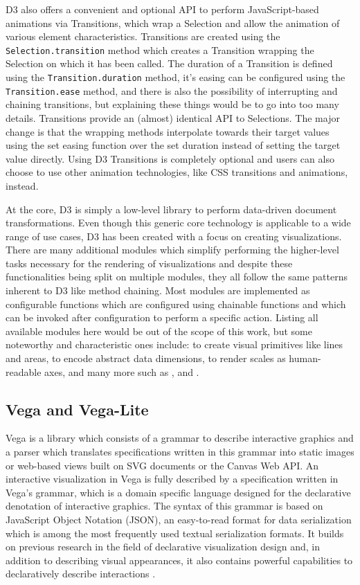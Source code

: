 D3 also offers a convenient and optional API to perform JavaScript-based animations via Transitions, which wrap a Selection and allow the animation of various element characteristics. 
Transitions are created using the \lstinline{Selection.transition} method which creates a Transition wrapping the Selection on which it has been called. 
The duration of a Transition is defined using the \lstinline{Transition.duration} method, it's easing can be configured using the \lstinline{Transition.ease} method, and there is also the possibility of interrupting and chaining transitions, but explaining these things would be to go into too many details. Transitions provide an (almost) identical API to Selections. The major change is that the wrapping methods interpolate towards their target values using the set easing function over the set duration instead of setting the target value directly. Using D3 Transitions is completely optional and users can also choose to use other animation technologies, like CSS transitions and animations, instead.

At the core, D3 is simply a low-level library to perform data-driven document transformations. 
Even though this generic core technology is applicable to a wide range of use cases, D3 has been created with a focus on creating visualizations.
There are many additional modules which simplify performing the higher-level tasks necessary for the rendering of visualizations and despite these functionalities being split on multiple modules, they all follow the same patterns inherent to D3 like method chaining. 
Most modules are implemented as configurable functions which are configured using chainable functions and which can be invoked after configuration to perform a specific action.
Listing all available modules here would be out of the scope of this work, but some noteworthy and characteristic ones include:  to create visual primitives like lines and areas,  to encode abstract data dimensions,  to render scales as human-readable axes, and many more such as ,  and .

\subsection{Vega and Vega-Lite}

Vega \parencite{Vega} is a library which consists of a grammar to describe interactive graphics and a parser which translates specifications written in this grammar into static images or web-based views built on SVG documents or the Canvas Web API. 
An interactive visualization in Vega is fully described by a specification written in Vega's grammar, which is a domain specific language designed for the declarative denotation of interactive graphics. 
The syntax of this grammar is based on JavaScript Object Notation (JSON), an easy-to-read format for data serialization which is among the most frequently used textual serialization formats. 
It builds on previous research in the field of declarative visualization design \parencite{GrammarOfGraphics} and, in addition to describing visual appearances, it also contains powerful capabilities to declaratively describe interactions \parencite{ReactiveVega}. 


